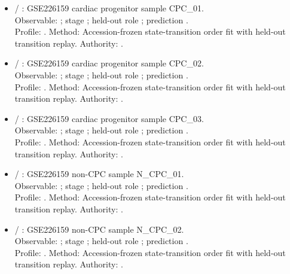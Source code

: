 \begin{itemize}
\item {} / : GSE226159 cardiac progenitor sample CPC\_01.\\ Observable: ; stage ; held-out role ; prediction .\\ Profile: . Method: Accession-frozen state-transition order fit with held-out transition replay. Authority: .
\item {} / : GSE226159 cardiac progenitor sample CPC\_02.\\ Observable: ; stage ; held-out role ; prediction .\\ Profile: . Method: Accession-frozen state-transition order fit with held-out transition replay. Authority: .
\item {} / : GSE226159 cardiac progenitor sample CPC\_03.\\ Observable: ; stage ; held-out role ; prediction .\\ Profile: . Method: Accession-frozen state-transition order fit with held-out transition replay. Authority: .
\item {} / : GSE226159 non-CPC sample N\_CPC\_01.\\ Observable: ; stage ; held-out role ; prediction .\\ Profile: . Method: Accession-frozen state-transition order fit with held-out transition replay. Authority: .
\item {} / : GSE226159 non-CPC sample N\_CPC\_02.\\ Observable: ; stage ; held-out role ; prediction .\\ Profile: . Method: Accession-frozen state-transition order fit with held-out transition replay. Authority: .

\end{itemize}
